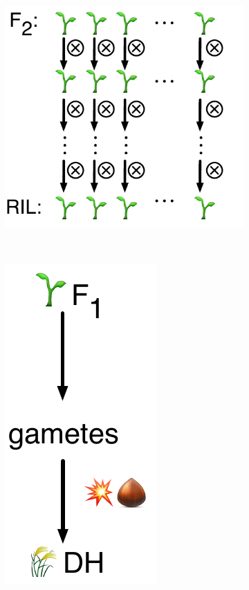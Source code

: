 \begin{figure}
\begin{subfigure}{0.45\textwidth}
\centering
\caption{}
\label{fig:lit:ri}
\includegraphics[height=0.20\textheight]{LitReview/Figures/crosses/RI.pdf}
\end{subfigure}
~
\begin{subfigure}{0.45\textwidth}
\centering
\caption{}
\label{fig:lit:dh}
\includegraphics[height=0.20\textheight]{LitReview/Figures/crosses/DH.pdf}
\end{subfigure}


\end{figure}
